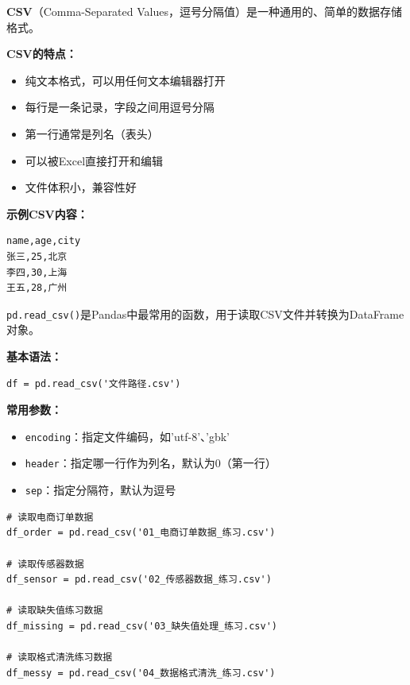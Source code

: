 \documentclass[12pt,a4paper]{article}
\begin{document}
\begin{theorybox}[什么是CSV文件？]
\textbf{CSV}（Comma-Separated Values，逗号分隔值）是一种通用的、简单的数据存储格式。

\textbf{CSV的特点：}
\begin{itemize}
    \item 纯文本格式，可以用任何文本编辑器打开
    \item 每行是一条记录，字段之间用逗号分隔
    \item 第一行通常是列名（表头）
    \item 可以被Excel直接打开和编辑
    \item 文件体积小，兼容性好
\end{itemize}

\textbf{示例CSV内容：}
\begin{verbatim}
name,age,city
张三,25,北京
李四,30,上海
王五,28,广州
\end{verbatim}
\end{theorybox}

\begin{knowledgebox}
\texttt{pd.read\_csv()}是Pandas中最常用的函数，用于读取CSV文件并转换为DataFrame对象。

\textbf{基本语法：}
\begin{verbatim}
df = pd.read_csv('文件路径.csv')
\end{verbatim}

\textbf{常用参数：}
\begin{itemize}
    \item \texttt{encoding}：指定文件编码，如'utf-8'、'gbk'
    \item \texttt{header}：指定哪一行作为列名，默认为0（第一行）
    \item \texttt{sep}：指定分隔符，默认为逗号
\end{itemize}
\end{knowledgebox}

\begin{lstlisting}[caption={读取四个练习文件}]
# 读取电商订单数据
df_order = pd.read_csv('01_电商订单数据_练习.csv')

# 读取传感器数据
df_sensor = pd.read_csv('02_传感器数据_练习.csv')

# 读取缺失值练习数据
df_missing = pd.read_csv('03_缺失值处理_练习.csv')

# 读取格式清洗练习数据
df_messy = pd.read_csv('04_数据格式清洗_练习.csv')
\end{lstlisting}
\end{document}

